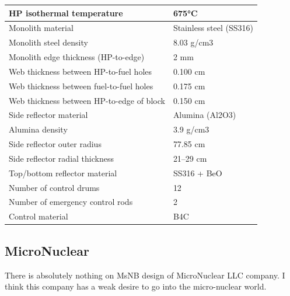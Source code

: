 \documentclass[10pt,a4paper]{article}
\begin{document}
\begin{table} [hbtp]
\begin{center}
\begin{tabular}{l     l}
HP isothermal temperature&675°C        \\
\hline 
Monolith material&Stainless steel (SS316)       \\
Monolith steel density&8.03 g/cm3                         \\
Monolith edge thickness (HP-to-edge)&2 mm                                 \\
Web thickness between HP-to-fuel holes&0.100 cm                            \\
Web thickness between fuel-to-fuel holes&0.175 cm                            \\
Web thickness between HP-to-edge of block&0.150 cm                            \\
\hline 
Side reflector material&Alumina (Al2O3)       \\
Alumina density&3.9 g/cm3                        \\
Side reflector outer radius&77.85 cm                                 \\
Side reflector radial thickness&21–29 cm                            \\
Top/bottom reflector material&SS316 + BeO                            \\
\hline 
Number of control drums&12       \\
Number of emergency control rods&2       \\
Control material&B4C                        \\
\hline 

\end{tabular}
\end{center}
\end{table}

\pagebreak
\subsection{MicroNuclear}
There is absolutely nothing on MsNB design of MicroNuclear LLC company. I think this company has a weak desire to go into the micro-nuclear world. 
\end{document}
